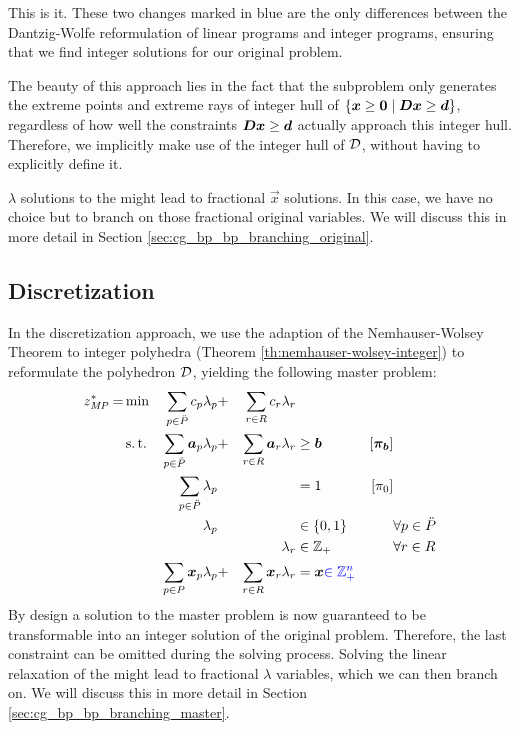 This is it. These two changes marked in blue are the only differences between the Dantzig-Wolfe reformulation of linear programs and integer programs, ensuring that we find integer solutions for our original problem.

The beauty of this approach lies in the fact that the subproblem only generates the extreme points and extreme rays of integer hull of $\{{\bm{x}} \geq {\bm{0}} \mid {\bm{D}} {\bm{x}} \geq {\bm{d}}\}$, regardless of how well the constraints ${\bm{D}} {\bm{x}} \geq {\bm{d}}$ actually approach this integer hull. Therefore, we implicitly make use of the integer hull of $\mathcal{D}$, without having to explicitly define it.

$\lambda$ solutions to the \MP{} might lead to fractional $\vec{x}$ solutions. In this case, we have no choice but to branch on those fractional original variables. We will discuss this in more detail in Section \ref{sec:cg_bp_bp_branching_original}.

\subsection{Discretization}\label{sec:cg_bp_ip_discretization}
In the discretization approach, we use the adaption of the Nemhauser-Wolsey Theorem to integer polyhedra (Theorem \ref{th:nemhauser-wolsey-integer}) to reformulate the polyhedron $\mathcal{D}$, yielding the following master problem:
\begin{equation}
\begin{aligned}
z^*_{\textit{MP}}{} = &\min & \sum_{p \in \ddot{P}} c_p \lambda_p &+ &\sum_{r \in R} c_r \lambda_r & & & \\
&\operatorname{s.t.} & \sum_{p \in \ddot{P}} {\bm{a}}_p \lambda_p &+ &\sum_{r \in R} {\bm{a}}_r \lambda_r & \geq {\bm{b}} & \left[{\bm{\pi}}_{\bm{b}}\right] \\
&& \sum_{p \in \ddot{P}} \lambda_p & & & = 1 & \left[\pi_0 \right] & \\
&& \lambda_p & & & \in \{0, 1\} & & \forall p \in \ddot{P} \\
&& & & \lambda_r & \in \mathbb{Z}_+ & & \forall r \in R \\
&& \sum_{p \in P} {\bm{x}}_p \lambda_p &+ &\sum_{r \in R} {\bm{x}}_r \lambda_r & = {\bm{x}} {\color{blue} \in \mathbb{Z}_+^n} & &
\end{aligned}
\end{equation}
By design a solution to the master problem is now guaranteed to be transformable into an integer solution of the original problem. Therefore, the last constraint can be omitted during the solving process. Solving the linear relaxation of the \RMP{} might lead to fractional $\lambda$ variables, which we can then branch on. We will discuss this in more detail in Section \ref{sec:cg_bp_bp_branching_master}.

